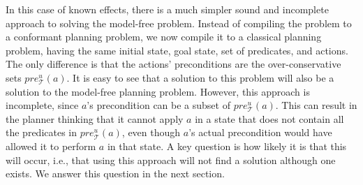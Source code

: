 \documentclass[letterpaper]{article}
\begin{document}
    
    In this case of known effects, there is a much simpler sound and incomplete approach to solving the model-free problem. Instead of compiling the problem to a conformant planning problem, we now compile it to a classical planning problem, having the same initial state, goal state, set of predicates, and actions. The only difference is that the actions' preconditions are the over-conservative sets $pre_\mathcal{T}^u(a)$. It is easy to see that a solution to this problem will also be a solution to the model-free planning problem. However, this approach is incomplete, since $a$'s precondition can be a subset of $pre_\mathcal{T}^u(a)$. This can result in the planner thinking that it cannot apply $a$ in a state that does not contain all the predicates in $pre_\mathcal{T}^u(a)$, even though $a$'s actual precondition would have allowed it to perform $a$ in that state. A key question is how likely it is that this will occur, i.e., that using this approach will not find a solution although one exists. We answer this question in the next section. 





\end{document}
